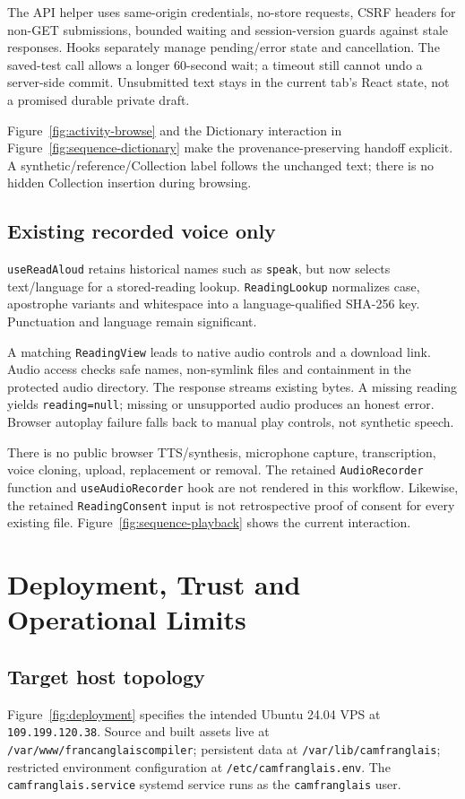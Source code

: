 \documentclass[11pt,a4paper]{article}
\begin{document}
The API helper uses same-origin credentials, no-store requests, CSRF headers
for non-GET submissions, bounded waiting and session-version guards against
stale responses. Hooks separately manage pending/error state and cancellation.
The saved-test call allows a longer 60-second wait; a timeout still cannot
undo a server-side commit. Unsubmitted text stays in the current tab's React
state, not a promised durable private draft.

Figure~\ref{fig:activity-browse} and the Dictionary interaction in
Figure~\ref{fig:sequence-dictionary} make the provenance-preserving handoff
explicit. A synthetic/reference/Collection label follows the unchanged text;
there is no hidden Collection insertion during browsing.

\subsection{Existing recorded voice only}
\texttt{useReadAloud} retains historical names such as \texttt{speak}, but now
selects text/language for a stored-reading lookup. \texttt{ReadingLookup}
normalizes case, apostrophe variants and whitespace into a language-qualified
SHA-256 key. Punctuation and language remain significant.

A matching \texttt{ReadingView} leads to native audio controls and a download
link. Audio access checks safe names, non-symlink files and containment in the
protected audio directory. The response streams existing bytes. A missing
reading yields \texttt{reading=null}; missing or unsupported audio produces an
honest error. Browser autoplay failure falls back to manual play controls,
not synthetic speech.

There is no public browser TTS/synthesis, microphone capture, transcription,
voice cloning, upload, replacement or removal. The retained
\texttt{AudioRecorder} function and \texttt{useAudioRecorder} hook are not
rendered in this workflow. Likewise, the retained \texttt{ReadingConsent}
input is not retrospective proof of consent for every existing file.
Figure~\ref{fig:sequence-playback} shows the current interaction.

\section{Deployment, Trust and Operational Limits}
\subsection{Target host topology}
Figure~\ref{fig:deployment} specifies the intended Ubuntu 24.04 VPS at
\texttt{109.199.120.38}. Source and built assets live at
\nolinkurl{/var/www/francanglaiscompiler}; persistent data at
\nolinkurl{/var/lib/camfranglais}; restricted environment configuration at
\nolinkurl{/etc/camfranglais.env}. The \texttt{camfranglais.service} systemd
service runs as the \texttt{camfranglais} user.
\end{document}
